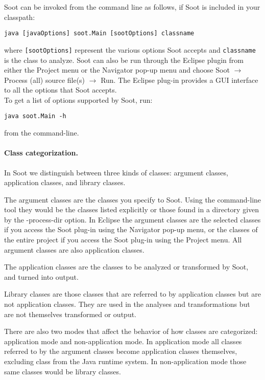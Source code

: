 \documentclass{article}
\newcommand{\code}[1]{\texttt{\small #1}}
\begin{document}
Soot can be invoked from the command line as follows, if Soot is
included in your classpath:
\begin{center}
  \code{java [javaOptions] soot.Main [sootOptions] classname}
\end{center}
where \code{[sootOptions]} represent the various options Soot accepts
and \code{classname} is the class to analyze. Soot can also be run
through the Eclipse plugin from either the Project menu or the
Navigator pop-up menu and choose Soot $\rightarrow$ Process (all)
source file(s) $\rightarrow$ Run. The Eclipse plug-in provides a GUI
interface to all the options that Soot accepts.\\

To get a list of options supported by Soot, run:
\begin{center}
  \code{java soot.Main -h}
\end{center}
from the command-line.

\paragraph{Class categorization.}

In Soot we distinguish between three kinds of classes: argument
classes, application classes, and library classes.

The argument classes are the classes you specify to Soot. Using the
command-line tool they would be the classes listed explicitly or those
found in a directory given by the -process-dir option. In Eclipse the
argument classes are the selected classes if you access the Soot
plug-in using the Navigator pop-up menu, or the classes of the entire
project if you access the Soot plug-in using the Project menu. All
argument classes are also application classes.

The application classes are the classes to be analyzed or transformed
by Soot, and turned into output.

Library classes are those classes that are referred to by application
classes but are not application classes. They are used in the analyses
and transformations but are not themselves transformed or output.

There are also two modes that affect the behavior of how classes are
categorized: application mode and non-application mode. In application
mode all classes referred to by the argument classes become
application classes themselves, excluding class from the Java runtime
system. In non-application mode those same classes would be library
classes.
\end{document}
